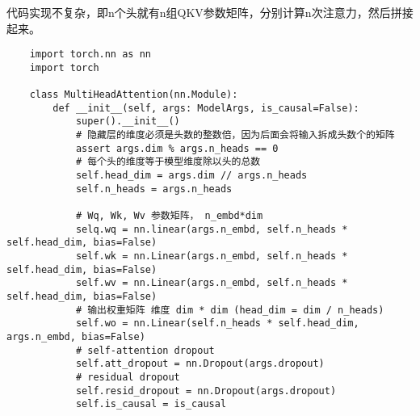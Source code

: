 \documentclass{article}
\begin{document}
代码实现不复杂，即n个头就有n组QKV参数矩阵，分别计算n次注意力，然后拼接起来。
\begin{verbatim}
    import torch.nn as nn
    import torch

    class MultiHeadAttention(nn.Module):
        def __init__(self, args: ModelArgs, is_causal=False):
            super().__init__()
            # 隐藏层的维度必须是头数的整数倍，因为后面会将输入拆成头数个的矩阵
            assert args.dim % args.n_heads == 0
            # 每个头的维度等于模型维度除以头的总数
            self.head_dim = args.dim // args.n_heads
            self.n_heads = args.n_heads

            # Wq, Wk, Wv 参数矩阵， n_embd*dim
            selq.wq = nn.linear(args.n_embd, self.n_heads * self.head_dim, bias=False)
            self.wk = nn.Linear(args.n_embd, self.n_heads * self.head_dim, bias=False)
            self.wv = nn.Linear(args.n_embd, self.n_heads * self.head_dim, bias=False)
            # 输出权重矩阵 维度 dim * dim (head_dim = dim / n_heads)
            self.wo = nn.Linear(self.n_heads * self.head_dim, args.n_embd, bias=False)
            # self-attention dropout
            self.att_dropout = nn.Dropout(args.dropout)
            # residual dropout
            self.resid_dropout = nn.Dropout(args.dropout)
            self.is_causal = is_causal

            

\end{verbatim}
% 
\end{document}

